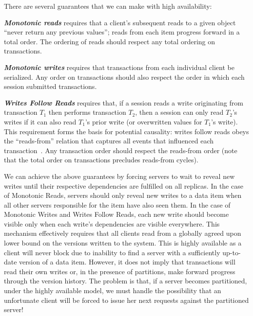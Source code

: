 There are several guarantees that we can make with high availability:

\vspace{.5em}\noindent\textit{\textbf{Monotonic reads}} requires that
a client's subsequent reads to a given object ``never return any
previous values''; reads from each item progress forward in a total
order. The ordering of reads should respect any total ordering on
transactions.

\vspace{.5em}\noindent\textit{\textbf{Monotonic writes}} requires
that transactions from each individual client be serialized. Any order
on transactions should also respect the order in which each session
submitted transactions.

\vspace{.5em}\noindent\textit{\textbf{Writes Follow Reads}} requires
that, if a session reads a write originating from transaction $T_1$
then performs transaction $T_2$, then a session can only read $T_2$'s
writes if it can also read $T_1$'s prior write (or overwritten values
for $T_1$'s write). This requirement forms the basis for potential
causality: writes follow reads obeys the ``reads-from'' relation that
captures all events that influenced each
transaction~\cite{causalmemory}. Any transaction order should respect
the reads-from order (note that the total order on transactions
precludes reads-from cycles).\vspace{.5em}

We can achieve the above guarantees by forcing servers to wait to
reveal new writes until their respective dependencies are fulfilled on
all replicas. In the case of Monotonic Reads, servers should only
reveal new writes to a data item when all other servers responsible
for the item have also seen them. In the case of Monotonic Writes and
Writes Follow Reads, each new write should become visible only when
each write's dependencies are visible everywhere. This mechanism
effectively requires that all clients read from a globally agreed upon
lower bound on the versions written to the system. This is highly
available as a client will never block due to inability to find a
server with a sufficiently up-to-date version of a data item. However,
it does not imply that transactions will read their own writes or, in
the presence of partitions, make forward progress through the version
history. The problem is that, if a server becomes partitioned, under
the highly available model, we must handle the possibility that an
unfortunate client will be forced to issue her next requests against
the partitioned server!

